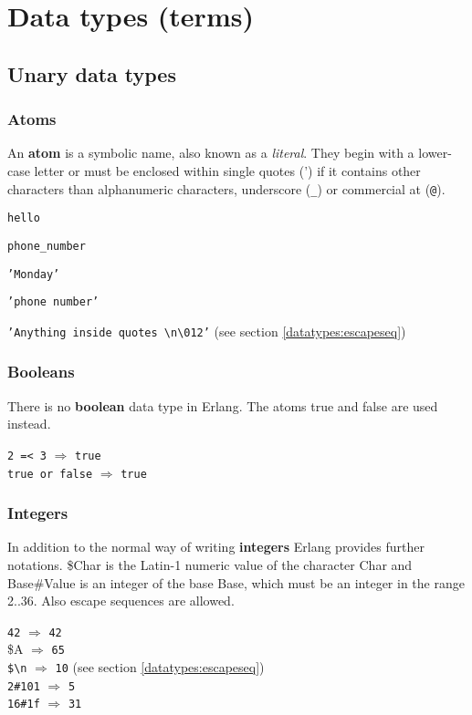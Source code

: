 \chapter{Data types (terms)}
\label{datatypes}

\section{Unary data types}

\subsection{Atoms}
\label{datatypes:atom}
An \textbf{atom} is a symbolic name, also known as a
\textit{literal}. They begin with a lower-case letter or must be
enclosed within single quotes (') if it contains other characters than
alphanumeric characters, underscore (\texttt{\_}) or commercial at
(\texttt{@}).

\texttt{hello}

\texttt{phone\_number}

\texttt{'Monday'}

\texttt{'phone number'}

\texttt{'Anything inside quotes \textbackslash n\textbackslash 012'}
(see section \ref{datatypes:escapeseq})


\subsection{Booleans}
\label{datatypes:boolean}
There is no \textbf{boolean} data type in Erlang. The atoms true and
false are used instead.

\texttt{2 =< 3} $\Rightarrow$ \texttt{true} \\
\texttt{true or false} $\Rightarrow$ \texttt{true}


\subsection{Integers}
\label{datatypes:integer}
In addition to the normal way of writing \textbf{integers} Erlang
provides further notations. \$Char is the Latin-1 numeric value of the
character Char and Base\#Value is an integer of the base Base, which
must be an integer in the range 2..36. Also escape sequences are
allowed.


\texttt{42} $\Rightarrow$ \texttt{42} \\
\$A  $\Rightarrow$ \texttt{65} \\
\texttt{\$\textbackslash n} $\Rightarrow$  \texttt{10}
(see section \ref{datatypes:escapeseq}) \\
\texttt{2\#101} $\Rightarrow$ \texttt{5} \\
\texttt{16\#1f} $\Rightarrow$ \texttt{31}


